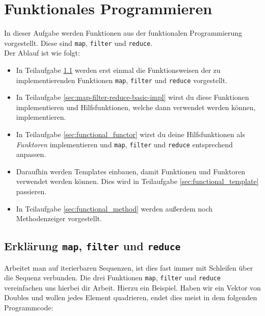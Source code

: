 \section{Funktionales Programmieren \experimental}

\experimentaltextbox

In dieser Aufgabe werden Funktionen aus der funktionalen Programmierung vorgestellt.
Diese sind \lstinline{map}, \lstinline{filter} und \lstinline{reduce}. \\

Der Ablauf ist wie folgt:
\begin{itemize}
    \item In Teilaufgabe \ref{sec:map-filter-reduce-intro} werden erst einmal die Funktionsweisen der zu implementierenden Funktionen \lstinline{map}, \lstinline{filter} und \lstinline{reduce} vorgestellt.
	\item In Teilaufgabe \ref{sec:map-filter-reduce-basic-impl} wirst du diese Funktionen implementieren und Hilfsfunktionen, welche dann verwendet werden können, implementieren.
	\item In Teilaufgabe \ref{sec:functional_functor} wirst du deine Hilfsfunktionen als \emph{Funktoren} implementieren und \lstinline{map}, \lstinline{filter} und \lstinline{reduce} entsprechend anpassen.
	\item Daraufhin werden Templates einbauen, damit Funktionen und Funktoren verwendet werden können. Dies wird in Teilaufgabe \ref{sec:functional_template} passieren.
	\item In Teilaufgabe \ref{sec:functional_method} werden außerdem noch Methodenzeiger vorgestellt.
\end{itemize}

\subsection{Erklärung \lstinline{map}, \lstinline{filter} und \lstinline{reduce}}\label{sec:map-filter-reduce-intro}

Arbeitet man auf iterierbaren Sequenzen, ist dies fast immer mit Schleifen über die Sequenz verbunden.
Die drei Funktionen \lstinline{map}, \lstinline{filter} und \lstinline{reduce} vereinfachen uns hierbei dir Arbeit.
Hierzu ein Beispiel.
Haben wir ein Vektor von Doubles und wollen jedes Element quadrieren, endet dies meist in dem folgenden Programmcode:



